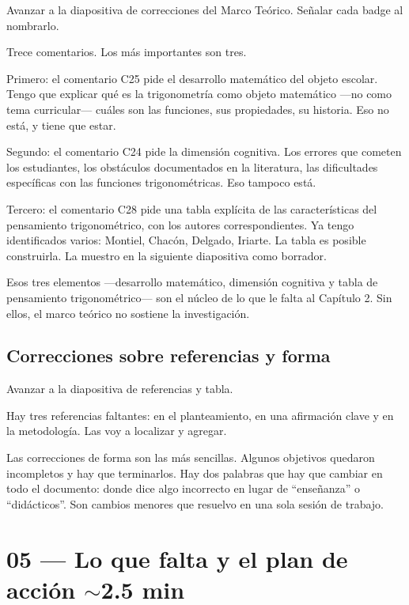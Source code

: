\documentclass[11pt, letterpaper]{article}
\newenvironment{accion}{%
  \par\smallskip
  \color{GrisAnotacion}\small\itshape\faHandPointRight\enspace
}{%
  \par\smallskip\normalcolor\normalsize\normalfont
}
\begin{document}
\begin{accion}
  Avanzar a la diapositiva de correcciones del Marco Teórico.
  Señalar cada badge al nombrarlo.
\end{accion}

Trece comentarios. Los más importantes son tres.

Primero: el comentario C25 pide el desarrollo matemático del objeto escolar. Tengo que explicar qué es la trigonometría como objeto matemático —no como tema curricular— cuáles son las funciones, sus propiedades, su historia. Eso no está, y tiene que estar.

Segundo: el comentario C24 pide la dimensión cognitiva. Los errores que cometen los estudiantes, los obstáculos documentados en la literatura, las dificultades específicas con las funciones trigonométricas. Eso tampoco está.

Tercero: el comentario C28 pide una tabla explícita de las características del pensamiento trigonométrico, con los autores correspondientes. Ya tengo identificados varios: Montiel, Chacón, Delgado, Iriarte. La tabla es posible construirla. La muestro en la siguiente diapositiva como borrador.

\begin{clave}
  Esos tres elementos —desarrollo matemático, dimensión cognitiva y tabla de
  pensamiento trigonométrico— son el núcleo de lo que le falta al Capítulo 2.
  Sin ellos, el marco teórico no sostiene la investigación.
\end{clave}

\subsection{Correcciones sobre referencias y forma}

\begin{accion}
  Avanzar a la diapositiva de referencias y tabla.
\end{accion}

Hay tres referencias faltantes: en el planteamiento, en una afirmación clave y en la metodología. Las voy a localizar y agregar.

Las correcciones de forma son las más sencillas. Algunos objetivos quedaron incompletos y hay que terminarlos. Hay dos palabras que hay que cambiar en todo el documento: donde dice algo incorrecto en lugar de ``enseñanza'' o ``didácticos''. Son cambios menores que resuelvo en una sola sesión de trabajo.

\section{05 — Lo que falta y el plan de acción \hfill {\normalfont\small\color{GrisAnotacion}$\sim$2.5 min}}
\end{document}

